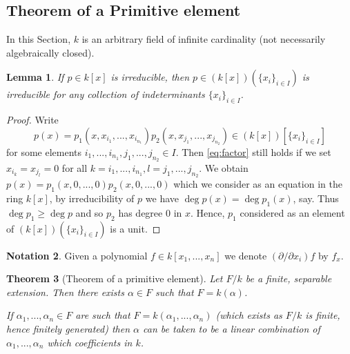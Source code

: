 \documentclass[12pt]{article}
\theoremstyle{plain}
\newtheorem{thm}{Theorem}[subsection] %
\newtheorem{lemma}[thm]{Lemma}
\theoremstyle{definition}
\newtheorem{notation}[thm]{Notation}
\begin{document}
	\subsection{Theorem of a Primitive element}
	In this Section, $k$ is an arbitrary field of infinite cardinality (not necessarily algebraically closed).
	\begin{lemma}
		\label{lem:irred_in_ext}
		If $p \in k[x]$ is irreducible, then $p \in (k[x])(\lbrace x_i\rbrace_{i \in I})$ is irreducible for any collection of indeterminants $\lbrace x_i \rbrace_{i \in I}$.
	\end{lemma}
	\begin{proof}
		Write
		\begin{equation}\label{eq:factor}
			p(x) = p_1(x,x_{i_1},...,x_{i_{n_1}})p_2(x,x_{j_1},...,x_{j_{{n_2}}}) \in (k[x])[\lbrace x_i\rbrace_{i \in I}]    
		\end{equation}
		for some elements $i_{1},...,i_{n_1},j_1,...,j_{n_2} \in I$. Then \eqref{eq:factor} still holds if we set $x_{i_k} = x_{j_l} = 0$ for all $k= i_1,...,i_{n_1}, l = j_1,...,j_{n_2}$. We obtain $p(x) = p_1(x,0,...,0)p_2(x,0,...,0)$ which we consider as an equation in the ring $k[x]$, by irreducibility of $p$ we have $\operatorname{deg}p(x) = \operatorname{deg}p_1(x)$, say. Thus $\operatorname{deg}p_1 \geq \operatorname{deg}p$ and so $p_2$ has degree $0$ in $x$. Hence, $p_1$ considered as an element of $(k[x])(\lbrace x_i\rbrace_{i \in I})$ is a unit.
	\end{proof}
	\begin{notation}
		Given a polynomial $f \in k[x_1,...,x_n]$ we denote $(\partial/\partial x_i)f$ by $f_{x}$.
	\end{notation}
	\begin{thm}[Theorem of a primitive element]
		\label{thm:primitive_element}
		Let $F/k$ be a finite, separable extension. Then there exists $\alpha \in F$ such that $F = k(\alpha)$.
		
		If $\alpha_1,...,\alpha_n \in F$ are such that $F = k(\alpha_1,...,\alpha_n)$ (which exists as $F/k$ is finite, hence finitely generated) then $\alpha$ can be taken to be a linear combination of $\alpha_1,...,\alpha_n$ which coefficients in $k$.
	\end{thm}
\end{document}
